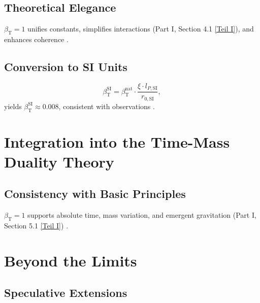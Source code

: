 \documentclass[twocolumn,aps,prl]{revtex4-2}
\newcommand{\betaT}{\beta_{\text{T}}}
\begin{document}
	\subsection{Theoretical Elegance}
	\label{subsec:theoretical_elegance}
	
	\(\betaT = 1\) unifies constants, simplifies interactions (Part I, Section 4.1 \href{https://github.com/jpascher/T0-Time-Mass-Duality/tree/main/2/pdf/English/QMRelTimeMassPart1En.pdf}{[Teil I]}), and enhances coherence \cite{pascher_alphabeta_2025}.
	
	\subsection{Conversion to SI Units}
	\label{subsec:conversion_si}
	
	\begin{equation}
		\betaT^{\text{SI}} = \betaT^{\text{nat}} \cdot \frac{\xi \cdot l_{P,\text{SI}}}{r_{0,\text{SI}}},
		\label{eq:beta_conversion}
	\end{equation}
	yields \(\betaT^{\text{SI}} \approx 0.008\), consistent with observations \cite{pascher_alphabeta_2025}.
	
	\section{Integration into the Time-Mass Duality Theory}
	\label{sec:integration_t0}
	
	\subsection{Consistency with Basic Principles}
	\label{subsec:consistency_principles}
	
	\(\betaT = 1\) supports absolute time, mass variation, and emergent gravitation (Part I, Section 5.1 \href{https://github.com/jpascher/T0-Time-Mass-Duality/tree/main/2/pdf/English/QMRelTimeMassPart1En.pdf}{[Teil I]}) \cite{pascher_lagrange_2025}.
	
	\section{Beyond the Limits}
	\label{sec:beyond_limits}
	
	\subsection{Speculative Extensions}
	\label{subsec:speculative_extensions}
	
\end{document}
